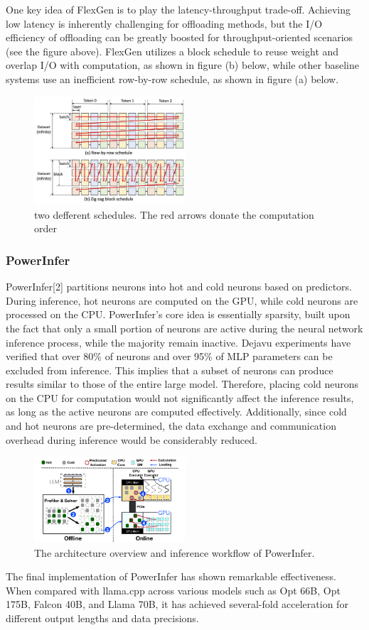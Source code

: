 \documentclass[conference]{IEEEtran}
\begin{document}
One key idea of FlexGen is to play the latency-throughput trade-off. Achieving low latency is inherently challenging for offloading methods, but the I/O efficiency of offloading can be greatly boosted for throughput-oriented scenarios (see the figure above). FlexGen utilizes a block schedule to reuse weight and overlap I/O with computation, as shown in figure (b) below, while other baseline systems use an inefficient row-by-row schedule, as shown in figure (a) below.
\begin{figure}[htbp]
    \centerline{\includegraphics[width=0.5\textwidth]{device fig2.jpg}}
    \caption{two defferent schedules. The red arrows donate the computation order}
    \label{fig}
\end{figure}

\subsubsection{PowerInfer}
PowerInfer[2] partitions neurons into hot and cold neurons based on predictors. During inference, hot neurons are computed on the GPU, while cold neurons are processed on the CPU.
PowerInfer's core idea is essentially sparsity, built upon the fact that only a small portion of neurons are active during the neural network inference process, while the majority remain inactive. Dejavu experiments have verified that over 80\% of neurons and over 95\% of MLP parameters can be excluded from inference. This implies that a subset of neurons can produce results similar to those of the entire large model. Therefore, placing cold neurons on the CPU for computation would not significantly affect the inference results, as long as the active neurons are computed effectively. Additionally, since cold and hot neurons are pre-determined, the data exchange and communication overhead during inference would be considerably reduced.
\begin{figure}[htbp]
    \centerline{\includegraphics[width=0.5\textwidth]{device fig1.png}}
    \caption{The architecture overview and inference workflow of PowerInfer.}
    \label{fig}
\end{figure}
The final implementation of PowerInfer has shown remarkable effectiveness. When compared with llama.cpp across various models such as Opt 66B, Opt 175B, Falcon 40B, and Llama 70B, it has achieved several-fold acceleration for different output lengths and data precisions.
\end{document}
